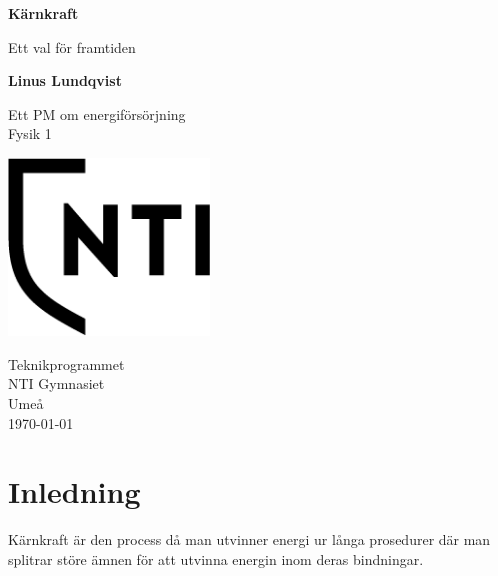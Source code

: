 \documentclass[11pt]{article}
\begin{document}
    \begin{titlepage}
        \begin{center}
            \vspace*{1cm}

            \Huge
            \textbf{Kärnkraft}

            \vspace{0.5cm}
            \LARGE
            Ett val för framtiden

            \vspace{1.5cm}

            \textbf{Linus Lundqvist}

            \vfill

            Ett PM om energiförsörjning \\
            Fysik 1

            \vspace{0.8cm}

             \includegraphics[width=0.4\textwidth]{NTI Gymnasiet_Symbol_print_svart.png}

            \Large
            Teknikprogrammet\\
            NTI Gymnasiet\\
            Umeå\\
            \today

        \end{center}
    \end{titlepage}

    \tableofcontents
    \newpage

    \section{Inledning}
    Kärnkraft är den process då man utvinner energi ur långa prosedurer där man splitrar störe ämnen för att utvinna energin inom deras bindningar.
\end{document}

